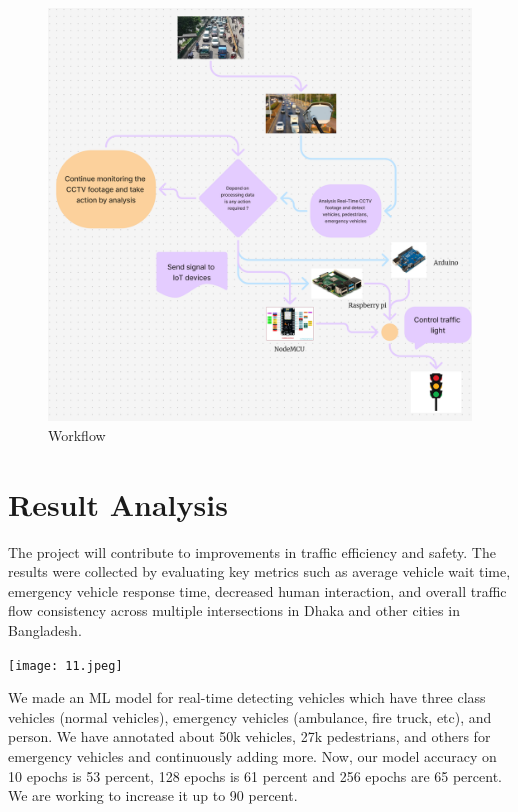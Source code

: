 \documentclass[usenatbib]{tjaa}
\begin{document}
\noindent
\begin{figure}
  \includegraphics[width=\columnwidth]{6_.png}
  \caption{Workflow}
  \label{fig:simple}
\end{figure}

\section[]{Result Analysis}
The project will contribute to improvements in traffic efficiency and safety. The results were collected by evaluating key metrics such as average vehicle wait time, emergency vehicle response time, decreased human interaction, and overall traffic flow consistency across multiple intersections in Dhaka and other cities in Bangladesh.

\noindent %
\begin{minipage}{0.5\textwidth}
    \centering
    \texttt{[image: 11.jpeg]} %
\end{minipage}%

We made an ML model for real-time detecting vehicles which have three class vehicles (normal vehicles), emergency vehicles (ambulance, fire truck, etc), and person. We have annotated about 50k vehicles, 27k pedestrians, and others for emergency vehicles and continuously adding more. Now, our model accuracy on 10 epochs is 53 percent, 128 epochs is 61 percent and 256 epochs are 65 percent. We are working to increase it up to 90 percent.
\end{document}

